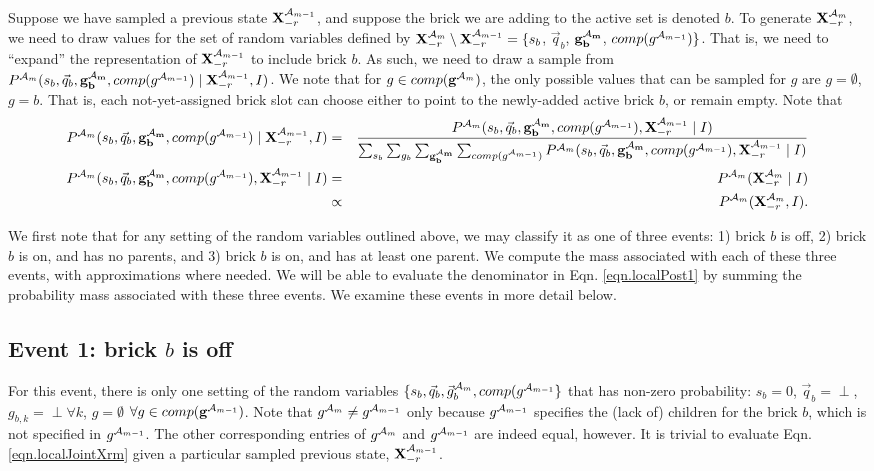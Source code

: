 \documentclass[11pt]{article}
\newcommand{\A}{{\cal A}}
\newcommand{\X}{\mathbf{X}}
\newcommand{\Xrm}{\X^{\Am}_{-r}}
\newcommand{\Am}{\A_{m}}
\newcommand{\gcomp}{comp(\mathbf{g}^{\Am})}
\newcommand{\gcompPrev}{comp(\mathbf{g}^{\A_{m-1}})}
\newcommand{\qb}{\vec{q}_b}
\begin{document}
Suppose we have sampled a previous state $\X^{\A_{m-1}}_{-r}$, and suppose the brick we are adding to the active set is denoted $b$. To generate $\Xrm$, we need to draw values for the set of random variables defined by $\Xrm \setminus \X^{\A_{m-1}}_{-r} = \{s_b$, $\qb$, $\mathbf{g^{\Am}_b}$, $comp(g^{\A_{m-1}})\}$. That is, we need to ``expand'' the representation of $\X^{\A_{m-1}}_{-r}$ to include brick $b$. As such, we need to draw a sample from $P^{\Am}(s_b, \qb, \mathbf{g^{\Am}_b}, comp(g^{\A_{m-1}}) \mid \X^{\A_{m-1}}_{-r}, I)$. We note that for $g \in \gcomp$, the only possible values that can be sampled for $g$ are $g = \emptyset$, $g= b$. That is, each not-yet-assigned brick slot can choose either to point to the newly-added active brick $b$, or remain empty. Note that
\begin{eqnarray}
	P^{\Am}(s_b, \qb, \mathbf{g^{\Am}_b}, comp(g^{\A_{m-1}}) \mid \X^{\A_{m-1}}_{-r}, I) &=& \frac{P^{\Am}(s_b, \qb, \mathbf{g^{\Am}_b}, comp(g^{\A_{m-1}}), \X^{\A_{m-1}}_{-r} \mid I)}{\sum_{s_b} \sum_{g_b}\sum_{\mathbf{g^{\Am}_b}}\sum_{comp(g^{\A_{m-1}})} P^{\Am}(s_b, \qb, \mathbf{g^{\Am}_b}, comp(g^{\A_{m-1}}), \X^{\A_{m-1}}_{-r} \mid I)} \label{eqn.localPost1} \\
P^{\Am}(s_b, \qb, \mathbf{g^{\Am}_b}, comp(g^{\A_{m-1}}), \X^{\A_{m-1}}_{-r} \mid I) &=& P^{\Am}(\Xrm \mid I) \\
&\propto& P^{\Am}(\Xrm, I). \label{eqn.localPost}
\end{eqnarray}

We first note that for any setting of the random variables outlined above, we may classify it as one of three events: 1) brick $b$ is off, 2) brick $b$ is on, and has no parents, and 3) brick $b$ is on, and has at least one parent. We compute the mass associated with each of these three events, with approximations where needed. We will be able to evaluate the denominator in Eqn. \ref{eqn.localPost1} by summing the probability mass associated with these three events. We examine these events in more detail below.

\subsection*{Event 1: brick $b$ is off}

For this event, there is only one setting of the random variables $\{s_b, \qb, \vec{g}^{\Am}_b, comp(g^{\A_{m-1}}\}$ that has non-zero probability: $s_b = 0$, $\qb = \perp$, $g_{b,k} = \perp \forall k$, $g = \emptyset$ $\forall g \in \gcompPrev$. Note that $g^{\A_{m}} \neq g^{\A_{m-1}}$ only because $g^{\A_{m-1}}$ specifies the (lack of) children for the brick $b$, which is not specified in $g^{\A_{m-1}}$. The other corresponding entries of $g^{\A_{m}}$ and $g^{\A_{m-1}}$ are indeed equal, however. It is trivial to evaluate Eqn. \ref{eqn.localJointXrm} given a particular sampled previous state, $\X^{\A_{m-1}}_{-r}$.
\end{document}
